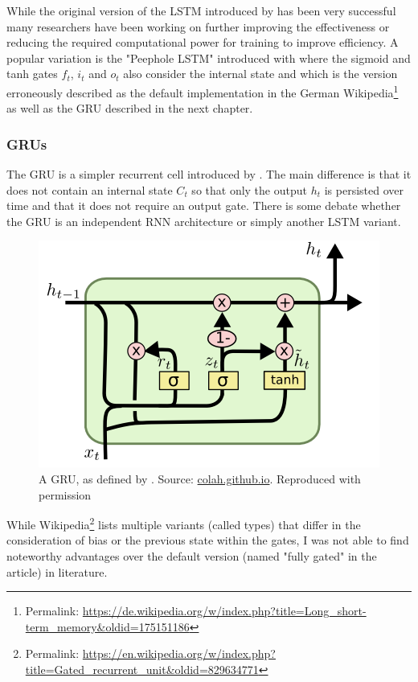 While the original version of the LSTM introduced by \cite{Hochreiter:1997:LSM:1246443.1246450} has been very successful many researchers have  been working on further improving the effectiveness or reducing the required computational power for training to improve efficiency. A popular variation is the "Peephole LSTM" introduced with \cite{861302} where the sigmoid and tanh gates $f_t$, $i_t$ and $o_t$ also consider the internal state and which is the version erroneously described as the default implementation in the German Wikipedia\footnote{Permalink: \url{https://de.wikipedia.org/w/index.php?title=Long_short-term_memory&oldid=175151186}} as well as the GRU described in the next chapter.


\subsubsection{GRUs}


The GRU is a simpler recurrent cell introduced by \cite{DBLP:journals/corr/ChoMGBSB14}. The main difference is that it does not contain an internal state $C_t$ so that only the output $h_t$ is persisted over time and that it does not require an output gate. There is some debate whether the GRU is an independent RNN architecture or simply another LSTM variant. 


\begin{figure}[h]
    \centering
	\includegraphics[width=.8\textwidth]{./images/illustrations/GRU}
    \caption{A GRU, as defined by \cite{DBLP:journals/corr/ChoMGBSB14}. Source: \url{colah.github.io}. Reproduced with permission}
    \label{fig:mesh1}
\end{figure}

While Wikipedia\footnote{Permalink: \url{https://en.wikipedia.org/w/index.php?title=Gated_recurrent_unit&oldid=829634771}} lists multiple variants (called types) that differ in the consideration of bias or the previous state within the gates, I was not able to find noteworthy advantages over the default version (named "fully gated" in the article) in literature.


